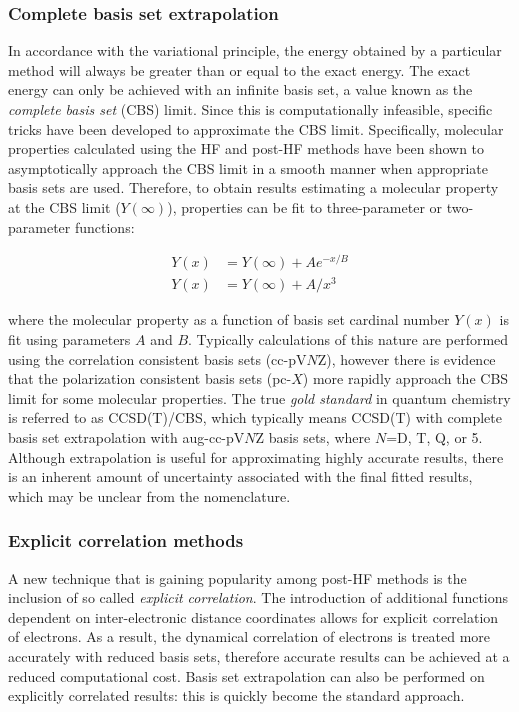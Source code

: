 \subsubsection{Complete basis set extrapolation}

In accordance with the variational principle, the energy obtained by a
particular method will always be greater than or equal to the exact energy. The
exact energy can only be achieved with an infinite basis set, a value known as
the \emph{complete basis set} (CBS) limit.\cite{Truhlar1998} Since this is
computationally infeasible, specific tricks have been developed to approximate
the CBS limit. Specifically, molecular properties calculated using the HF and
post-HF methods have been shown to asymptotically approach the CBS limit in a
smooth manner when appropriate basis sets are used. Therefore, to obtain
results estimating a molecular property at the CBS limit ($Y(\infty)$),
properties can be fit to three-parameter\cite{Feller1992,Feller1993} or
two-parameter functions:\cite{Helgaker1997,Halkier1998}

\begin{align}
  Y(x) &= Y(\infty) + Ae^{-x/B} \\
  Y(x) &= Y(\infty) + A/x^3
\end{align}

\noindent where the molecular property as a function of basis set cardinal
number $Y(x)$ is fit using parameters $A$ and $B$. Typically calculations of
this nature are performed using the correlation consistent basis sets
(cc-pV$N$Z), however there is evidence that the polarization consistent basis
sets (pc-$X$) more rapidly approach the CBS limit for some molecular
properties.\cite{Kupka2007} The true \emph{gold standard} in quantum chemistry
is referred to as CCSD(T)/CBS, which typically means CCSD(T) with complete
basis set extrapolation with aug-cc-pV$N$Z basis sets, where $N$=D, T, Q, or 5.
Although extrapolation is useful for approximating highly accurate results,
there is an inherent amount of uncertainty associated with the final fitted
results, which may be unclear from the nomenclature.

\subsubsection{Explicit correlation methods}

A new technique that is gaining popularity among post-HF methods is the
inclusion of so called \emph{explicit correlation}.\cite{Shiozaki2008,Kohn2008}
The introduction of additional functions dependent on inter-electronic distance
coordinates allows for explicit correlation of electrons.\cite{Tenno2012} As a
result, the dynamical correlation of electrons is treated more accurately with
reduced basis sets, therefore accurate results can be achieved at a reduced
computational cost. Basis set extrapolation can also be performed on explicitly
correlated results: this is quickly become the standard
approach.\cite{Feller2013}


